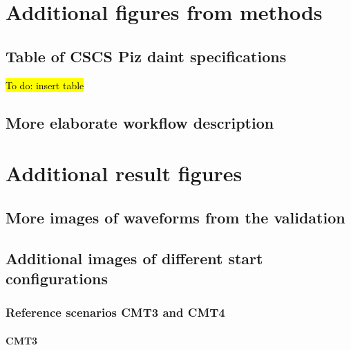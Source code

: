\documentclass[../Text/00main.tex]{subfiles}
\begin{document}
\chapter{Additional figures from methods}

\section{Table of CSCS Piz daint specifications}\label{app:pizdaint}

\hl{To do: insert table}

\section{More elaborate workflow description}\label{app:software}

\chapter{Additional result figures}

\section{More images of waveforms from the validation}\label{app:validation}


\section{Additional images of different start configurations}{\label{app:morereffigs}}

\subsection{Reference scenarios CMT3 and CMT4}

\subsubsection{CMT3}
\end{document}
